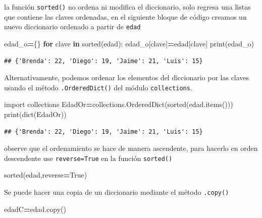 \documentclass[
]{book}
\newenvironment{Shaded}{\begin{snugshade}}{\end{snugshade}}
\newcommand{\BuiltInTok}[1]{#1}
\newcommand{\ControlFlowTok}[1]{\textcolor[rgb]{0.13,0.29,0.53}{\textbf{#1}}}
\newcommand{\ImportTok}[1]{#1}
\newcommand{\KeywordTok}[1]{\textcolor[rgb]{0.13,0.29,0.53}{\textbf{#1}}}
\newcommand{\NormalTok}[1]{#1}
\newcommand{\OperatorTok}[1]{\textcolor[rgb]{0.81,0.36,0.00}{\textbf{#1}}}
\newcommand{\VariableTok}[1]{\textcolor[rgb]{0.00,0.00,0.00}{#1}}
\theoremstyle{definition}
\theoremstyle{definition}
\theoremstyle{definition}
\theoremstyle{definition}
\theoremstyle{remark}
\begin{document}
la función \texttt{sorted()} no ordena ni modifica el diccionario, solo regresa una listas que contiene las claves ordenadas, en el siguiente bloque de código creamos un nuevo diccionario ordenado a partir de \texttt{edad}

\begin{Shaded}
\begin{Highlighting}[]
\NormalTok{edad\_o}\OperatorTok{=}\NormalTok{\{\}}
\ControlFlowTok{for}\NormalTok{ clave }\KeywordTok{in} \BuiltInTok{sorted}\NormalTok{(edad):}
\NormalTok{    edad\_o[clave]}\OperatorTok{=}\NormalTok{edad[clave]}
\BuiltInTok{print}\NormalTok{(edad\_o)}
\end{Highlighting}
\end{Shaded}

\begin{verbatim}
## {'Brenda': 22, 'Diego': 19, 'Jaime': 21, 'Luis': 15}
\end{verbatim}

Alternativamente, podemos ordenar los elementos del diccionario por las claves usando el método \texttt{.OrderedDict()} del módulo \texttt{collections}.

\begin{Shaded}
\begin{Highlighting}[]
\ImportTok{import}\NormalTok{ collections}
\NormalTok{EdadOr}\OperatorTok{=}\NormalTok{collections.OrderedDict(}\BuiltInTok{sorted}\NormalTok{(edad.items()))}
\BuiltInTok{print}\NormalTok{(}\BuiltInTok{dict}\NormalTok{(EdadOr))}
\end{Highlighting}
\end{Shaded}

\begin{verbatim}
## {'Brenda': 22, 'Diego': 19, 'Jaime': 21, 'Luis': 15}
\end{verbatim}

observe que el ordenamiento se hace de manera ascendente, para hacerlo en orden descendente use \texttt{reverse=True} en la función \texttt{sorted()}

\begin{Shaded}
\begin{Highlighting}[]
\BuiltInTok{sorted}\NormalTok{(edad,reverse}\OperatorTok{=}\VariableTok{True}\NormalTok{) }
\end{Highlighting}
\end{Shaded}

Se puede hacer una copia de un diccionario mediante el método \texttt{.copy()}

\begin{Shaded}
\begin{Highlighting}[]
\NormalTok{edadC}\OperatorTok{=}\NormalTok{edad.copy()}
\end{Highlighting}
\end{Shaded}
\end{document}
